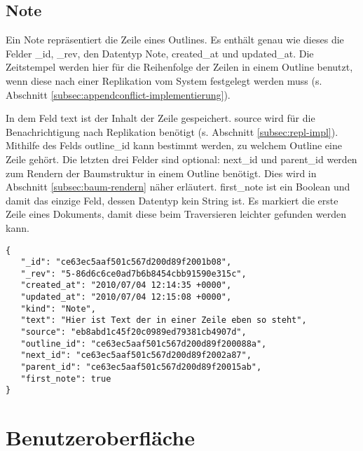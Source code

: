 \subsection{Note}

Ein {\selectfont Note} repräsentiert die Zeile eines Outlines. Es enthält genau wie dieses die Felder {\selectfont\_id}, {\selectfont\_rev}, den Datentyp {\selectfont Note}, {\selectfont created\_at} und {\selectfont updated\_at}. Die Zeitstempel werden hier für die Reihenfolge der Zeilen in einem Outline benutzt, wenn diese nach einer Replikation vom System festgelegt werden muss (s. Abschnitt \ref{subsec:appendconflict-implementierung}). 

In dem Feld {\selectfont text} ist der Inhalt der Zeile gespeichert. {\selectfont source} wird für die Benachrichtigung nach Replikation benötigt (s. Abschnitt \ref{subsec:repl-impl}). Mithilfe des Felds {\selectfont outline\_id} kann bestimmt werden, zu welchem Outline eine Zeile gehört. Die letzten drei Felder sind optional: {\selectfont next\_id} und {\selectfont parent\_id} werden zum Rendern der Baumstruktur in einem Outline benötigt. Dies wird in Abschnitt \ref{subsec:baum-rendern} näher erläutert. {\selectfont first\_note} ist ein Boolean und damit das einzige Feld, dessen Datentyp kein String ist. Es markiert die erste Zeile eines Dokuments, damit diese beim Traversieren leichter gefunden werden kann.

\medskip 
\begin{lstlisting}[label=code:note-example, caption=Ein Note-Dokument]
{
   "_id": "ce63ec5aaf501c567d200d89f2001b08",
   "_rev": "5-86d6c6ce0ad7b6b8454cbb91590e315c",
   "created_at": "2010/07/04 12:14:35 +0000",
   "updated_at": "2010/07/04 12:15:08 +0000",
   "kind": "Note",
   "text": "Hier ist Text der in einer Zeile eben so steht",
   "source": "eb8abd1c45f20c0989ed79381cb4907d",
   "outline_id": "ce63ec5aaf501c567d200d89f200088a",
   "next_id": "ce63ec5aaf501c567d200d89f2002a87",
   "parent_id": "ce63ec5aaf501c567d200d89f20015ab",
   "first_note": true
}
\end{lstlisting}





\section{Benutzeroberfläche}

